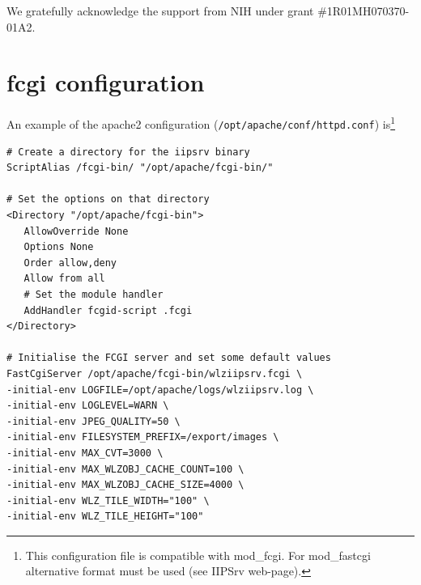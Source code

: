 \documentclass[11pt]{article}
\begin{document}
We gratefully acknowledge the support from NIH under grant \#1R01MH070370-01A2.

\appendix

\section{fcgi configuration}
\label{sec:httpconf}
An example of the apache2 configuration
(\texttt{/opt/apache/conf/httpd.conf})
is\footnote{This configuration file is compatible with mod\_fcgi.
For mod\_fastcgi alternative format must be used (see IIPSrv web-page).}

\begin{verbatim}
# Create a directory for the iipsrv binary
ScriptAlias /fcgi-bin/ "/opt/apache/fcgi-bin/"

# Set the options on that directory
<Directory "/opt/apache/fcgi-bin">
   AllowOverride None
   Options None
   Order allow,deny
   Allow from all
   # Set the module handler
   AddHandler fcgid-script .fcgi
</Directory>

# Initialise the FCGI server and set some default values
FastCgiServer /opt/apache/fcgi-bin/wlziipsrv.fcgi \
-initial-env LOGFILE=/opt/apache/logs/wlziipsrv.log \
-initial-env LOGLEVEL=WARN \
-initial-env JPEG_QUALITY=50 \
-initial-env FILESYSTEM_PREFIX=/export/images \
-initial-env MAX_CVT=3000 \
-initial-env MAX_WLZOBJ_CACHE_COUNT=100 \
-initial-env MAX_WLZOBJ_CACHE_SIZE=4000 \
-initial-env WLZ_TILE_WIDTH="100" \
-initial-env WLZ_TILE_HEIGHT="100"
\end{verbatim}



\end{document}
